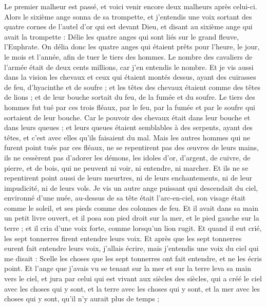 \begin{multicols}{2}
Le premier malheur est passé, et voici venir encore deux malheurs après celui-ci.
Alors le sixième ange sonna de sa trompette, et j'entendis une voix sortant des quatre cornes de l'autel d'or qui est devant Dieu,
et disant au sixième ange qui avait la trompette : Délie les quatre anges qui sont liés sur le grand fleuve, l’Euphrate.
On délia donc les quatre anges qui étaient prêts pour l'heure, le jour, le mois et l'année, afin de tuer le tiers des hommes.
Le nombre des cavaliers de l’armée était de deux cents millions, car j’en entendis le nombre.
Et je vis aussi dans la vision les chevaux et ceux qui étaient montés dessus, ayant des cuirasses de feu, d'hyacinthe et de soufre ; et les têtes des chevaux étaient comme des têtes de lions ; et de leur bouche sortait du feu, de la fumée et du soufre.
Le tiers des hommes fut tué par ces trois fléaux, par le feu, par la fumée et par le soufre qui sortaient de leur bouche.
Car le pouvoir des chevaux était dans leur bouche et dans leurs queues ; et leurs queues étaient semblables à des serpents, ayant des têtes, et c’est avec elles qu’ils faisaient du mal.
Mais les autres hommes qui ne furent point tués par ces fléaux, ne se repentirent pas des œuvres de leurs mains, ils ne cessèrent pas d’adorer les démons, les idoles d'or, d'argent, de cuivre, de pierre, et de bois, qui ne peuvent ni voir, ni entendre, ni marcher.
Et ils ne se repentirent point aussi de leurs meurtres, ni de leurs enchantements, ni de leur impudicité, ni de leurs vols.
\VerseOne{}Je vis un autre ange puissant qui descendait du ciel, environné d'une nuée, au-dessus de sa tête était l'arc-en-ciel, son visage était comme le soleil, et ses pieds comme des colonnes de feu.
Et il avait dans sa main un petit livre ouvert, et il posa son pied droit sur la mer, et le pied gauche sur la terre ;
et il cria d’une voix forte, comme lorsqu'un lion rugit. Et quand il eut crié, les sept tonnerres firent entendre leurs voix.
Et après que les sept tonnerres eurent fait entendre leurs voix, j'allais écrire, mais j'entendis une voix du ciel qui me disait : Scelle les choses que les sept tonnerres ont fait entendre, et ne les écris point.
Et l'ange que j'avais vu se tenant sur la mer et sur la terre leva sa main vers le ciel,
et jura par celui qui est vivant aux siècles des siècles, qui a créé le ciel avec les choses qui y sont, et la terre avec les choses qui y sont, et la mer avec les choses qui y sont, qu'il n'y aurait plus de temps ;

\end{multicols}
